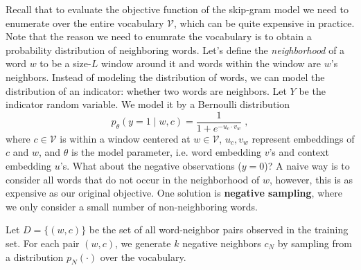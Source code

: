 \documentclass{article}
\theoremstyle{case}
\theoremstyle{definition}
\begin{document}
Recall that to evaluate the objective function of the skip-gram model
we need to enumerate over the entire vocabulary $\mathcal{V}$,
which can be quite expensive in practice.
Note that the reason we need to enumrate the vocabulary
is to obtain a probability distribution of neighboring words.
Let's define the \emph{neighborhood} of a word $w$ to be a size-$L$ window around it
and words within the window are $w$'s neighbors.
Instead of modeling the distribution of words,
we can model the distribution of an indicator: whether two words are neighbors.
Let $Y$ be the indicator random variable.
We model it by a Bernoulli distribution
$$
p_\theta(y=1\mid w, c) = \frac{1}{1 + e^{-u_c\cdot v_w}} \;,
$$
where $c \in \mathcal{V}$ is within a window centered at $w\in \mathcal{V}$,
$u_c, v_w$ represent embeddings of $c$ and $w$,
and $\theta$ is the model parameter, i.e. word embedding $v$'s and context embedding $u$'s.
What about the negative observations ($y=0$)?
A naive way is to consider all words that do not occur in the neighborhood of $w$, however, this is as expensive as our original objective.
One solution is \textbf{negative sampling}, where we only consider a small number of non-neighboring words.

Let $D=\{(w, c)\}$ be the set of all word-neighbor pairs observed in the training set.
For each pair $(w,c)$, we generate $k$ negative neighbors $c_N$ by sampling from a distribution $p_N(\cdot)$ over the vocabulary.
\end{document}
